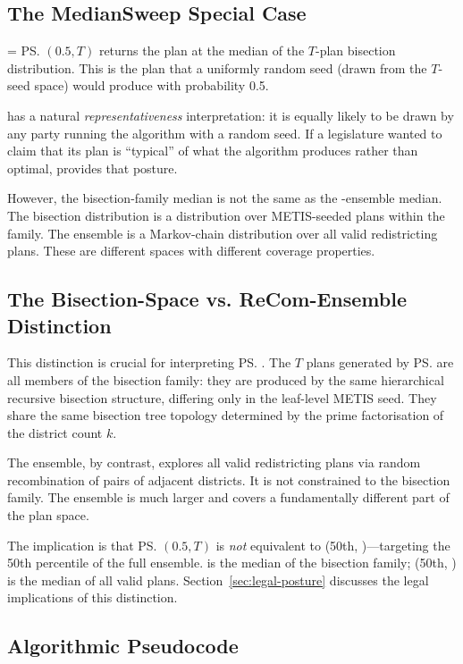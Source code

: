 \subsection{The MedianSweep Special Case}

\ms{} = \ps{}$(0.5, T)$ returns the plan at the median of the
$T$-plan bisection distribution.
This is the plan that a uniformly random seed (drawn from the $T$-seed
space) would produce with probability 0.5.

\ms{} has a natural \emph{representativeness} interpretation: it is equally
likely to be drawn by any party running the algorithm with a random seed.
If a legislature wanted to claim that its plan is ``typical'' of what the
algorithm produces rather than optimal, \ms{} provides that posture.

However, the bisection-family median is not the same as the \recom{}-ensemble
median.
The bisection distribution is a distribution over METIS-seeded plans
within the \ar{} family.
The \recom{} ensemble is a Markov-chain distribution over all valid
redistricting plans.
These are different spaces with different coverage properties.

\subsection{The Bisection-Space vs. ReCom-Ensemble Distinction}

This distinction is crucial for interpreting \ps{}.
The $T$ plans generated by \ps{} are all members of the \ar{} bisection
family: they are produced by the same hierarchical recursive bisection
structure, differing only in the leaf-level METIS seed.
They share the same bisection tree topology determined by the prime
factorisation of the district count $k$.

The \recom{} ensemble, by contrast, explores all valid redistricting plans
via random recombination of pairs of adjacent districts.
It is not constrained to the bisection family.
The \recom{} ensemble is much larger and covers a fundamentally different
part of the plan space.

The implication is that \ps{}$(0.5, T)$ is \emph{not} equivalent to
\ts{}(50th, \recom{})---targeting the 50th percentile of the full
\recom{} ensemble.
\ms{} is the median of the bisection family; \ts{}(50th, \recom{}) is
the median of all valid plans.
Section~\ref{sec:legal-posture} discusses the legal implications of this
distinction.

\subsection{Algorithmic Pseudocode}


